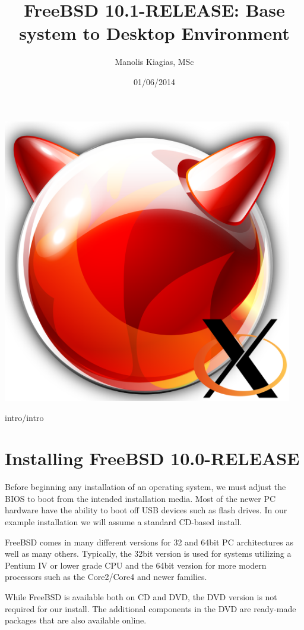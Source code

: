 \documentclass[a4paper,twoside,12pt]{article}
\author{Manolis Kiagias, MSc}
\title {FreeBSD 10.1-RELEASE: Base system to Desktop Environment}
\date{01/06/2014}
\begin{document}
%
\maketitle
\begin{center}
\includegraphics[width=0.95\textwidth]{images/main/freebsd-xorg-logo.png}
\end{center}
%
\cleardoublepage
%
 {intro/intro}
%
\section{Installing FreeBSD 10.0-RELEASE}
%
Before beginning any installation of an operating system, we must adjust the BIOS to boot from the intended installation media. Most of the newer PC hardware have the ability to boot off USB devices such as flash drives. In our example installation we will assume a standard CD-based install.

FreeBSD comes in many different versions for 32 and 64bit PC architectures as well as many others. Typically, the 32bit version is used for systems utilizing a Pentium IV or lower grade CPU and the 64bit version for more modern processors such as the Core2/Core4 and newer families.

While FreeBSD is available both on CD and DVD, the DVD version is not required for our install. The additional components in the DVD are ready-made packages that are also available online.
\end{document}
